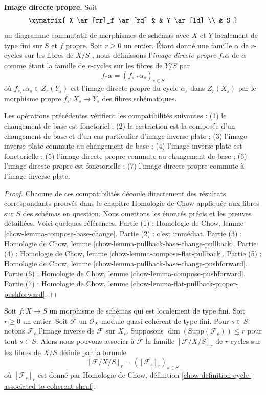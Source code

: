 \medskip\noindent
 {\bf Image directe propre.}  Soit 
$$
\xymatrix{
X \ar[rr]_f \ar[rd] & & Y \ar[ld] \\
& S
}
$$
 un diagramme commutatif de morphismes de schémas avec  $X$  et $Y$
  localement de type fini sur  $S$  et  $f$  propre. Soit $r \geq 0$  un entier. Étant 
donné une famille  $\alpha$  de $r$-cycles sur les fibres de  $X/S$ , nous définissons 
l'{\it image directe propre}   $f_*\alpha$  de $\alpha$  comme étant la famille de  
$r$-cycles sur les fibres de $Y/S$  par 
$$
f_*\alpha = (f_{s, *}\alpha_s)_{s \in S}
$$
 où  $f_{s, *}\alpha_s \in Z_r(Y_s)$  est l'image directe propre
 du cycle  $\alpha_s$  dans  $Z_r(X_s)$ par le morphisme propre  
$f_s : X_s \to Y_s$  des fibres schématiques. 

\begin{lemma} 
\label{lemma-compatibilities} Les 
opérations précédentes vérifient les compatibilités suivantes : (1) le changement
 de base est fonctoriel ; (2) la 
restriction est la composée d'un changement de base et d'un cas particulier d'image inverse
 plate ; (3) 
l'image inverse plate commute au changement de base ; 
(4) l'image inverse plate est fonctorielle
 ; (5) l'image directe propre commute au changement de 
base ; (6) l'image directe propre est fonctorielle 
; (7) l'image directe propre commute à l'image inverse plate. 
\end{lemma} 

\begin{proof}
 Chacune de ces compatibilités découle directement des résultats 
correspondants prouvés dans le chapitre Homologie de Chow appliquée aux fibres
 sur $S$  des schémas en question. Nous omettons les énoncés précis et les 
preuves détaillées. Voici quelques références. Partie
 (1) : Homologie de Chow, lemme 
\ref{chow-lemma-compose-base-change}. Partie 
(2) : c'est immédiat. 
Partie (3) : Homologie de Chow, lemme 
\ref{chow-lemma-pullback-base-change-pullback}. Partie
 (4) : Homologie de Chow, lemme 
\ref{chow-lemma-compose-flat-pullback}. Partie
 (5) : Homologie de Chow, lemme 
\ref{chow-lemma-pullback-base-change-pushforward}. Partie
 (6) : Homologie de Chow, lemme 
\ref{chow-lemma-compose-pushforward}. Partie
 (7) : Homologie de Chow, lemme 
\ref{chow-lemma-flat-pullback-proper-pushforward}. 
\end{proof} 

\begin{example} 
\label{example-family-associated-module} 
Soit  $f : X \to S$  un morphisme de schémas qui est localement de type fini. 
Soit $r \geq 0$  un entier. Soit  $\mathcal{F}$  un  
$\mathcal{O}_X$-module quasi-cohérent de type fini. Pour  $s \in S$  notons  $\mathcal{F}_s$
  l'image inverse de $\mathcal{F}$ sur $X_s$. 
Supposons  $\dim(\text{Supp}(\mathcal{F}_s)) \leq r$  pour tout  $s \in S$.
 Alors nous pouvons associer à  $\mathcal{F}$  la famille  $[\mathcal{F}/X/S]_r$  de 
$r$-cycles sur les fibres de  $X/S$  définie par la formule 
$$
[\mathcal{F}/X/S]_r = ([\mathcal{F}_s]_r)_{s \in S}
$$
 où  $[\mathcal{F}_s]_r$  est donné par Homologie de Chow, définition  
\ref{chow-definition-cycle-associated-to-coherent-sheaf}. 
\end{example} 

